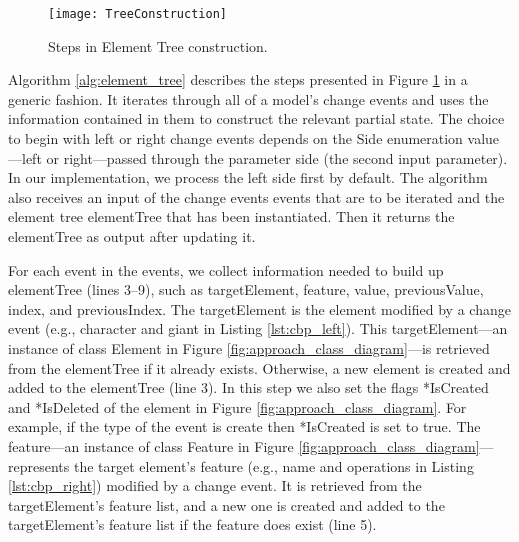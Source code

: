 \begin{figure}[ht]
  \centering
  \texttt{[image: TreeConstruction]}
  \caption{Steps in Element Tree construction.}
  \label{fig:tree_construction}
\end{figure}

Algorithm \ref{alg:element_tree} describes the steps presented in Figure \ref{fig:tree_construction} in a generic fashion. It iterates through all of a model’s change events and uses the information contained in them to construct the relevant partial state. The choice to begin with left or right change events depends on the \textsf{Side} enumeration value—\textsf{left} or \textsf{right}—passed through the parameter \textsf{side} (the second input parameter). In our implementation, we process the left side first by default. The algorithm also receives an input of the change events \textsf{events} that are to be iterated and the element tree \textsf{elementTree} that has been instantiated. Then it returns the \textsf{elementTree} as output after updating it.

For each \textsf{event} in the \textsf{events}, we collect information needed to build up \textsf{elementTree} (lines 3–9), such as \textsf{targetElement}, \textsf{feature}, \textsf{value}, \textsf{previousValue}, \textsf{index}, and \textsf{previousIndex}. The \textsf{targetElement} is the element modified by a change event (e.g., \textsf{character} and \textsf{giant} in Listing \ref{lst:cbp_left}). This \textsf{targetElement}—an instance of class Element in Figure \ref{fig:approach_class_diagram}—is retrieved from the \textsf{elementTree} if it already exists. Otherwise, a new element is created and added to the \textsf{elementTree} (line 3). In this step we also set the flags \textsf{*IsCreated} and \textsf{*IsDeleted} of the element in Figure \ref{fig:approach_class_diagram}. For example, if the type of the event is \textsf{create} then \textsf{*IsCreated} is set to \textsf{true}. The \textsf{feature}—an instance of class Feature in Figure \ref{fig:approach_class_diagram}—represents the target element’s feature (e.g., \textsf{name} and \textsf{operations} in Listing \ref{lst:cbp_right}) modified by a change event. It is retrieved from the \textsf{targetElement}’s feature list, and a new one is created and added to the \textsf{targetElement}’s feature list if the feature does exist (line 5).

